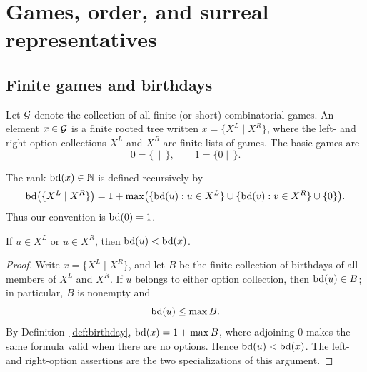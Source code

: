 \chapter{Games, order, and surreal representatives}

\section{Finite games and birthdays}

\begin{definition}
  \label{def:game}
  \leanok
  Let \(\mathcal{G}\) denote the collection of all finite (or short) combinatorial games.  An
  element \(x\in\mathcal{G}\) is a finite rooted tree written \(x=\{X^L\mid X^R\}\), where the
  left- and right-option collections \(X^L\) and \(X^R\) are finite lists of games.  The basic
  games are
  \[
    0=\{\,\mid\,\},\qquad 1=\{0\mid\,\}.
  \]
\end{definition}

\begin{definition}
  \label{def:birthday}
  \leanok
  The rank \(\operatorname{bd}(x)\in\mathbb N\) is defined recursively by
  \[
    \operatorname{bd}\bigl(\{X^L\mid X^R\}\bigr)
      = 1+\max\bigl(\{\operatorname{bd}(u):u\in X^L\}\cup
                         \{\operatorname{bd}(v):v\in X^R\}\cup\{0\}\bigr).
  \]
  Thus our convention is \(\operatorname{bd}(0)=1\).
\end{definition}

\begin{lemma}
  \label{lem:birthday-options}
  \leanok
  If \(u\in X^L\) or \(u\in X^R\), then \(\operatorname{bd}(u)<\operatorname{bd}(x)\).
\end{lemma}
\begin{proof}
  \leanok
  Write \(x=\{X^L\mid X^R\}\), and let \(B\) be the finite collection of
  birthdays of all members of \(X^L\) and \(X^R\).  If \(u\) belongs to either
  option collection, then \(\operatorname{bd}(u)\in B\); in particular, \(B\) is nonempty
  and
  \[
    \operatorname{bd}(u)\leq \max B.
  \]
  By Definition~\ref{def:birthday}, \(\operatorname{bd}(x)=1+\max B\), where adjoining
  \(0\) makes the same formula valid when there are no options.  Hence
  \(\operatorname{bd}(u)<\operatorname{bd}(x)\).  The left- and right-option assertions are the two
  specializations of this argument.
\end{proof}

